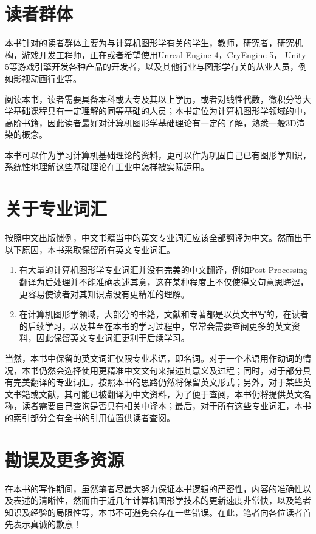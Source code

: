 \section*{读者群体}
本书针对的读者群体主要为与计算机图形学有关的学生，教师，研究者，研究机构，游戏开发工程师，正在或者希望使用Unreal Engine 4，CryEngine 5， Unity 5等游戏引擎开发各种产品的开发者，以及其他行业与图形学有关的从业人员，例如影视动画行业等。

阅读本书，读者需要具备本科或大专及其以上学历，或者对线性代数，微积分等大学基础课程具有一定理解的同等基础的人员；本书定位为计算机图形学领域的中，高阶书籍，因此读者最好对计算机图形学基础理论有一定的了解，熟悉一般3D渲染的概念。

本书可以作为学习计算机基础理论的资料，更可以作为巩固自己已有图形学知识，系统性地理解这些基础理论在工业中怎样被实际运用。



\section*{关于专业词汇}
按照中文出版惯例，中文书籍当中的英文专业词汇应该全部翻译为中文。然而出于以下原因，本书采取保留所有英文专业词汇。

\begin{enumerate}
	\item 有大量的计算机图形学专业词汇并没有完美的中文翻译，例如Post Processing翻译为后处理并不能准确表述其意，这在某种程度上不仅使得文句意思晦涩，更容易使读者对其知识点没有更精准的理解。
	\item 在计算机图形学领域，大部分的书籍，文献和专著都是以英文书写的，在读者的后续学习，以及甚至在本书的学习过程中，常常会需要查阅更多的英文资料，因此保留英文专业词汇更利于后续学习。
\end{enumerate}

当然，本书中保留的英文词汇仅限专业术语，即名词。对于一个术语用作动词的情况，本书仍然会选择使用更精准中文文句来描述其意义及过程；同时，对于部分具有完美翻译的专业词汇，按照本书的思路仍然将保留英文形式；另外，对于某些英文书籍或文献，其可能已被翻译为中文资料，为了便于查阅，本书仍将提供英文名称，读者需要自己查询是否具有相关中译本；最后，对于所有这些专业词汇，本书的索引部分会有全书的引用位置供读者查阅。



\section*{勘误及更多资源}
在本书的写作期间，虽然笔者尽最大努力保证本书逻辑的严密性，内容的准确性以及表述的清晰性，然而由于近几年计算机图形学技术的更新速度非常快，以及笔者知识及经验的局限性等，本书不可避免会存在一些错误。在此，笔者向各位读者首先表示真诚的歉意！

